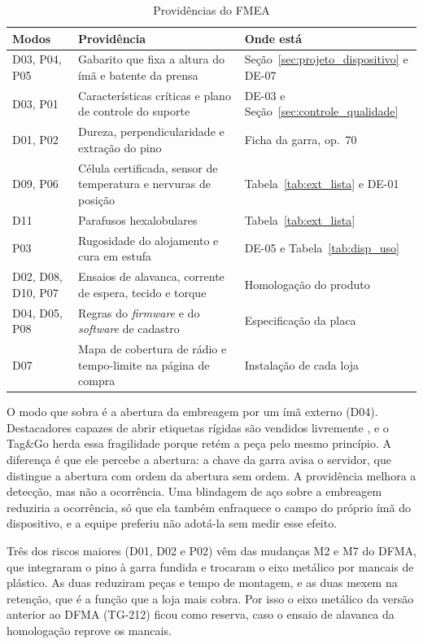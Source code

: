 \begin{table}[htbp]
    \centering
    \caption{Providências do FMEA}
    \label{tab:fmea_providencias}
    \footnotesize
    \renewcommand{\arraystretch}{1.3}
    \begin{tabularx}{\textwidth}{@{}
        >{\RaggedRight\arraybackslash}p{2.4cm}
        >{\RaggedRight\arraybackslash}X
        >{\RaggedRight\arraybackslash}p{4.6cm}@{}}
        \toprule
        \textbf{Modos} & \textbf{Providência} & \textbf{Onde está} \\
        \midrule
        D03, P04, P05 & Gabarito que fixa a altura do ímã e batente da prensa & Seção~\ref{sec:projeto_dispositivo} e DE-07 \\
        D03, P01 & Características críticas e plano de controle do suporte & DE-03 e Seção~\ref{sec:controle_qualidade} \\
        D01, P02 & Dureza, perpendicularidade e extração do pino & Ficha da garra, op.~70 \\
        D09, P06 & Célula certificada, sensor de temperatura e nervuras de posição & Tabela~\ref{tab:ext_lista} e DE-01 \\
        D11 & Parafusos hexalobulares & Tabela~\ref{tab:ext_lista} \\
        P03 & Rugosidade do alojamento e cura em estufa & DE-05 e Tabela~\ref{tab:disp_uso} \\
        \midrule
        D02, D08, D10, P07 & Ensaios de alavanca, corrente de espera, tecido e torque & Homologação do produto \\
        D04, D05, P08 & Regras do \textit{firmware} e do \textit{software} de cadastro & Especificação da placa \\
        D07 & Mapa de cobertura de rádio e tempo-limite na página de compra & Instalação de cada loja \\
        \bottomrule
    \end{tabularx}
\end{table}

O modo que sobra é a abertura da embreagem por um ímã externo (D04). Destacadores capazes de abrir etiquetas rígidas são vendidos livremente \cite{cablematic2026xy021}, e o Tag\&Go herda essa fragilidade porque retém a peça pelo mesmo princípio. A diferença é que ele percebe a abertura: a chave da garra avisa o servidor, que distingue a abertura com ordem da abertura sem ordem. A providência melhora a detecção, mas não a ocorrência. Uma blindagem de aço sobre a embreagem reduziria a ocorrência, só que ela também enfraquece o campo do próprio ímã do dispositivo, e a equipe preferiu não adotá-la sem medir esse efeito.

Três dos riscos maiores (D01, D02 e P02) vêm das mudanças M2 e M7 do DFMA, que integraram o pino à garra fundida e trocaram o eixo metálico por mancais de plástico. As duas reduziram peças e tempo de montagem, e as duas mexem na retenção, que é a função que a loja mais cobra. Por isso o eixo metálico da versão anterior ao DFMA (TG-212) ficou como reserva, caso o ensaio de alavanca da homologação reprove os mancais.
